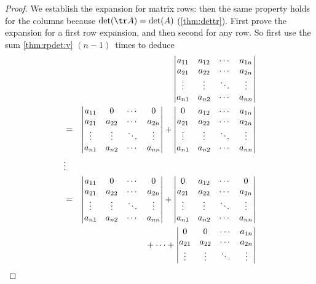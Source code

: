 \begin{proof} 
We establish the expansion for matrix rows: then the same property holds for the columns because \(\det(\tr A)=\det(A)\) (\autoref{thm:dettr}).
First prove the expansion for a first row expansion, and then second for any row.
So first use the sum \autoref{thm:rpdet:v} \((n-1)\)~times to deduce
\begin{eqnarray*}&&\hspace{-1em}
\begin{vmatrix} a_{11}&a_{12}&\cdots&a_{1n}
\\ a_{21}&a_{22}&\cdots&a_{2n}
\\ \vdots&\vdots&\ddots&\vdots
\\ a_{n1}&a_{n2}&\cdots&a_{nn}
\end{vmatrix}
\\&=&
\begin{vmatrix} a_{11}&0&\cdots&0
\\ a_{21}&a_{22}&\cdots&a_{2n}
\\ \vdots&\vdots&\ddots&\vdots
\\ a_{n1}&a_{n2}&\cdots&a_{nn}
\end{vmatrix}
+\begin{vmatrix} 0&a_{12}&\cdots&a_{1n}
\\ a_{21}&a_{22}&\cdots&a_{2n}
\\ \vdots&\vdots&\ddots&\vdots
\\ a_{n1}&a_{n2}&\cdots&a_{nn}
\end{vmatrix}
\\&\vdots&
\\&=&
\begin{vmatrix} a_{11}&0&\cdots&0
\\ a_{21}&a_{22}&\cdots&a_{2n}
\\ \vdots&\vdots&\ddots&\vdots
\\ a_{n1}&a_{n2}&\cdots&a_{nn}
\end{vmatrix}
+\begin{vmatrix} 0&a_{12}&\cdots&0
\\ a_{21}&a_{22}&\cdots&a_{2n}
\\ \vdots&\vdots&\ddots&\vdots
\\ a_{n1}&a_{n2}&\cdots&a_{nn}
\end{vmatrix}
\\&&{}
+\cdots
+\begin{vmatrix} 0&0&\cdots&a_{1n}
\\ a_{21}&a_{22}&\cdots&a_{2n}
\\ \vdots&\vdots&\ddots&\vdots

\end{vmatrix}
\end{eqnarray*}
\end{proof}
